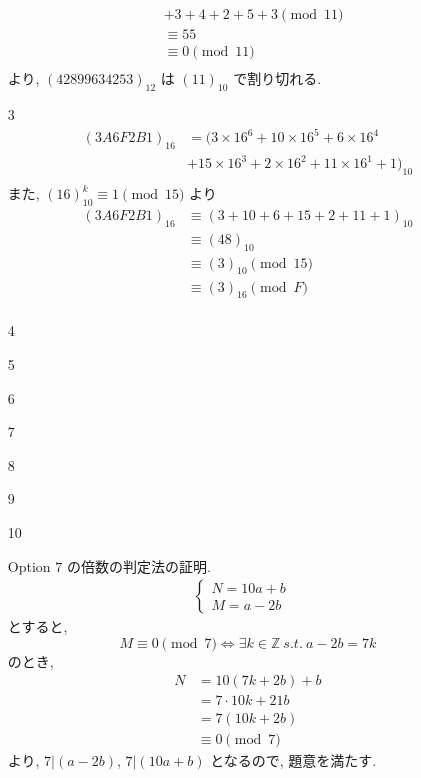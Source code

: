 \documentclass[12pt,a4paper]{jsarticle}
\begin{document}
\begin{enumerate}
\begin{align*}
 & + 3 + 4 + 2 + 5 +3 \pmod{11} \\
 &\equiv 55 \\
 &\equiv 0 \pmod{11} \\ 
 \end{align*}
 より, $(42899634253)_{12}$ は $(11)_{10}$ で割り切れる.
 \item[3]  \mbox{} \\
 \begin{align*}
 (3A6F2B1)_{16} &= (3 \times 16^{6} + 10 \times 16^{5} + 6 \times 16^{4} \\
  & + 15 \times 16^{3} + 2 \times 16^{2} + 11 \times 16^{1} + 1)_{10}\\
 \end{align*}
 また, $(16)_{10}^{k} \equiv 1 \pmod{15}$ より
 \begin{align*}
 (3A6F2B1)_{16}
 &\equiv (3 + 10 +6 + 15 + 2 + 11 + 1)_{10} \\
 &\equiv (48)_{10} \\
 &\equiv (3)_{10} \pmod{15} \\ 
 &\equiv (3)_{16} \pmod{F} \\
 \end{align*}
 \item[4]  \mbox{} \\
 \item[5]  \mbox{} \\
 \item[6]  \mbox{} \\
 \item[7]  \mbox{} \\
 \item[8]  \mbox{} \\
 \item[9]  \mbox{} \\
 \item[10]  \mbox{} \\
 \item[Option] $7$ の倍数の判定法の証明. \\
	\begin{align*}
		\begin{cases}
		N = 10a + b & \\
		M = a - 2b &
		\end{cases}
	\end{align*}
	とすると,
	\[ M \equiv 0 \pmod{7} \Leftrightarrow \exists k \in \mathbb{Z}~s.t.~a - 2b = 7k \]
	のとき,
	\begin{align*}
		N &= 10(7k + 2b) + b\\
		&= 7 \cdot 10k + 21b \\
		&= 7(10k + 2b) \\
		&\equiv 0 \pmod{7}
	\end{align*}
	より, $7|(a-2b)$, $7|(10a+b)$ となるので, 題意を満たす. 
\end{enumerate}
\pagebreak
\end{document}
